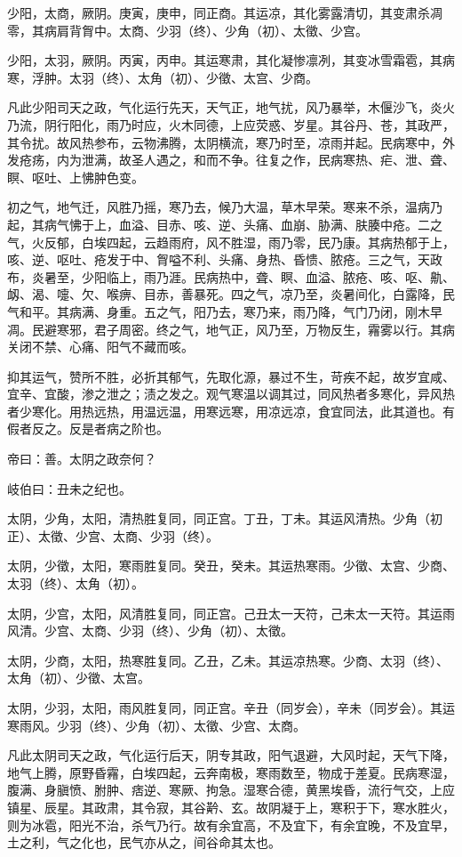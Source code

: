 \documentclass{article}%
\begin{document}
少阳，太商，厥阴。庚寅，庚申，同正商。其运凉，其化雾露清切，其变肃杀凋零，其病肩背胷中。太商、少羽（终）、少角（初）、太徵、少宫。

少阳，太羽，厥阴。丙寅，丙申。其运寒肃，其化凝惨凛冽，其变冰雪霜雹，其病寒，浮肿。太羽（终）、太角（初）、少徵、太宫、少商。

凡此少阳司天之政，气化运行先天，天气正，地气扰，风乃暴举，木偃沙飞，炎火乃流，阴行阳化，雨乃时应，火木同德，上应荧惑、岁星。其谷丹、苍，其政严，其令扰。故风热参布，云物沸腾，太阴横流，寒乃时至，凉雨并起。民病寒中，外发疮疡，内为泄满，故圣人遇之，和而不争。往复之作，民病寒热、疟、泄、聋、瞑、呕吐、上怫肿色变。

初之气，地气迁，风胜乃摇，寒乃去，候乃大温，草木早荣。寒来不杀，温病乃起，其病气怫于上，血溢、目赤、咳、逆、头痛、血崩、胁满、肤腠中疮。二之气，火反郁，白埃四起，云趋雨府，风不胜湿，雨乃零，民乃康。其病热郁于上，咳、逆、呕吐、疮发于中、胷嗌不利、头痛、身热、昏愦、脓疮。三之气，天政布，炎暑至，少阳临上，雨乃涯。民病热中，聋、瞑、血溢、脓疮、咳、呕、鼽、衂、渴、嚏、欠、喉痹、目赤，善暴死。四之气，凉乃至，炎暑间化，白露降，民气和平。其病满、身重。五之气，阳乃去，寒乃来，雨乃降，气门乃闭，刚木早凋。民避寒邪，君子周密。终之气，地气正，风乃至，万物反生，霿雾以行。其病关闭不禁、心痛、阳气不藏而咳。

抑其运气，赞所不胜，必折其郁气，先取化源，暴过不生，苛疾不起，故岁宜咸、宜辛、宜酸，渗之泄之；渍之发之。观气寒温以调其过，同风热者多寒化，异风热者少寒化。用热远热，用温远温，用寒远寒，用凉远凉，食宜同法，此其道也。有假者反之。反是者病之阶也。

帝曰：善。太阴之政奈何？

岐伯曰：丑未之纪也。

太阴，少角，太阳，清热胜复同，同正宫。丁丑，丁未。其运风清热。少角（初正）、太徵、少宫、太商、少羽（终）。

太阴，少徵，太阳，寒雨胜复同。癸丑，癸未。其运热寒雨。少徵、太宫、少商、太羽（终）、太角（初）。

太阴，少宫，太阳，风清胜复同，同正宫。己丑太一天符，己未太一天符。其运雨风清。少宫、太商、少羽（终）、少角（初）、太徵。

太阴，少商，太阳，热寒胜复同。乙丑，乙未。其运凉热寒。少商、太羽（终）、太角（初）、少徵、太宫。

太阴，少羽，太阳，雨风胜复同，同正宫。辛丑（同岁会），辛未（同岁会）。其运寒雨风。少羽（终）、少角（初）、太徵、少宫、太商。

凡此太阴司天之政，气化运行后天，阴专其政，阳气退避，大风时起，天气下降，地气上腾，原野昏霿，白埃四起，云奔南极，寒雨数至，物成于差夏。民病寒湿，腹满、身䐜愤、胕肿、痞逆、寒厥、拘急。湿寒合德，黄黑埃昏，流行气交，上应镇星、辰星。其政肃，其令寂，其谷黅、玄。故阴凝于上，寒积于下，寒水胜火，则为冰雹，阳光不治，杀气乃行。故有余宜高，不及宜下，有余宜晚，不及宜早，土之利，气之化也，民气亦从之，间谷命其太也。
\end{document}
